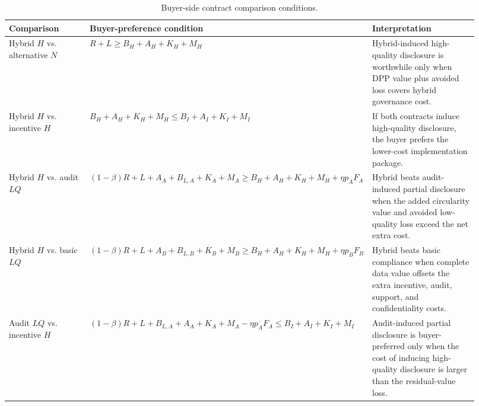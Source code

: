\documentclass[final,5p,times,authoryear]{elsarticle}
\begin{document}
\begin{table}[t]
\centering
\begingroup
\setlength{\tabcolsep}{3pt}
\small
\caption{Buyer-side contract comparison conditions.}
\label{tab:buyer_contract_comparisons}
\begin{tabular}{@{}p{0.22\linewidth}p{0.39\linewidth}p{0.31\linewidth}@{}}
\toprule
Comparison & Buyer-preference condition & Interpretation \\
\midrule
Hybrid $H$ vs. alternative $N$ & $R+L \geq B_H+A_H+K_H+M_H$ & Hybrid-induced high-quality disclosure is worthwhile only when DPP value plus avoided loss covers hybrid governance cost. \\
Hybrid $H$ vs. incentive $H$ & $B_H+A_H+K_H+M_H \leq B_I+A_I+K_I+M_I$ & If both contracts induce high-quality disclosure, the buyer prefers the lower-cost implementation package. \\
Hybrid $H$ vs. audit $LQ$ & $(1-\beta)R+L+A_A+B_{L,A}+K_A+M_A \geq B_H+A_H+K_H+M_H+\eta p_AF_A$ & Hybrid beats audit-induced partial disclosure when the added circularity value and avoided low-quality loss exceed the net extra cost. \\
Hybrid $H$ vs. basic $LQ$ & $(1-\beta)R+L+A_B+B_{L,B}+K_B+M_B \geq B_H+A_H+K_H+M_H+\eta p_BF_B$ & Hybrid beats basic compliance when complete data value offsets the extra incentive, audit, support, and confidentiality costs. \\
Audit $LQ$ vs. incentive $H$ & $(1-\beta)R+L+B_{L,A}+A_A+K_A+M_A-\eta p_AF_A \leq B_I+A_I+K_I+M_I$ & Audit-induced partial disclosure is buyer-preferred only when the cost of inducing high-quality disclosure is larger than the residual-value loss. \\
\bottomrule
\end{tabular}
\endgroup
\end{table}
\end{document}
